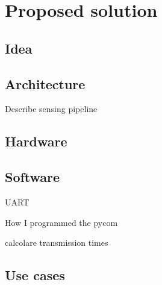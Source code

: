 
\chapter{Proposed solution}\label{chapter:proposed_solution}

\section{Idea}

\section{Architecture}

Describe sensing pipeline 

\section{Hardware}

\section{Software}



UART

How I programmed the pycom



calcolare transmission times

\section{Use cases}
